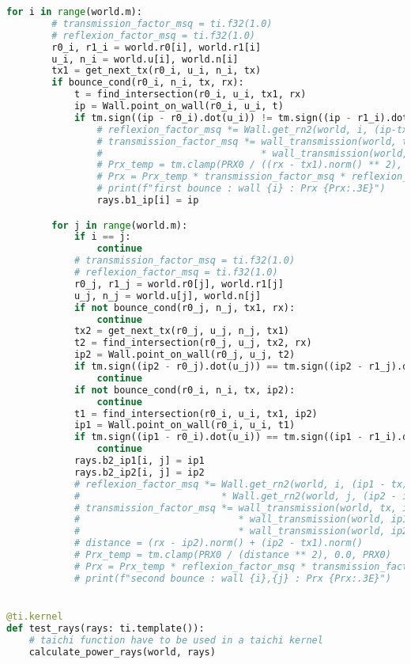 \begin{lstlisting}[language=python]
    for i in range(world.m):
        # transmission_factor_msq = ti.f32(1.0)
        # reflexion_factor_msq = ti.f32(1.0)
        r0_i, r1_i = world.r0[i], world.r1[i]
        u_i, n_i = world.u[i], world.n[i]
        tx1 = get_next_tx(r0_i, u_i, n_i, tx)
        if bounce_cond(r0_i, n_i, tx, rx):
            t = find_intersection(r0_i, u_i, tx1, rx)
            ip = Wall.point_on_wall(r0_i, u_i, t)
            if tm.sign((ip - r0_i).dot(u_i)) != tm.sign((ip - r1_i).dot(u_i)):
                # reflexion_factor_msq *= Wall.get_rn2(world, i, (ip-tx).normalized())
                # transmission_factor_msq *= wall_transmission(world, tx, ip, i) \
                #                            * wall_transmission(world, ip, rx, i)
                # Prx_temp = tm.clamp(PRX0 / ((rx - tx1).norm() ** 2), 0.0, PRX0)
                # Prx = Prx_temp * transmission_factor_msq * reflexion_factor_msq
                # print(f"first bounce : wall {i} : Prx {Prx:.3E}")
                rays.b1_ip[i] = ip

        for j in range(world.m):
            if i == j:
                continue
            # transmission_factor_msq = ti.f32(1.0)
            # reflexion_factor_msq = ti.f32(1.0)
            r0_j, r1_j = world.r0[j], world.r1[j]
            u_j, n_j = world.u[j], world.n[j]
            if not bounce_cond(r0_j, n_j, tx1, rx):
                continue
            tx2 = get_next_tx(r0_j, u_j, n_j, tx1)
            t2 = find_intersection(r0_j, u_j, tx2, rx)
            ip2 = Wall.point_on_wall(r0_j, u_j, t2)
            if tm.sign((ip2 - r0_j).dot(u_j)) == tm.sign((ip2 - r1_j).dot(u_j)):
                continue
            if not bounce_cond(r0_i, n_i, tx, ip2):
                continue
            t1 = find_intersection(r0_i, u_i, tx1, ip2)
            ip1 = Wall.point_on_wall(r0_i, u_i, t1)
            if tm.sign((ip1 - r0_i).dot(u_i)) == tm.sign((ip1 - r1_i).dot(u_i)):
                continue
            rays.b2_ip1[i, j] = ip1
            rays.b2_ip2[i, j] = ip2
            # reflexion_factor_msq *= Wall.get_rn2(world, i, (ip1 - tx).normalized()) \
            #                         * Wall.get_rn2(world, j, (ip2 - ip1).normalized())
            # transmission_factor_msq *= wall_transmission(world, tx, ip1, i) \
            #                            * wall_transmission(world, ip1, ip2, j, i) \
            #                            * wall_transmission(world, ip2, rx, j)
            # distance = (rx - ip2).norm() + (ip2 - tx1).norm()
            # Prx_temp = tm.clamp(PRX0 / (distance ** 2), 0.0, PRX0)
            # Prx = Prx_temp * reflexion_factor_msq * transmission_factor_msq
            # print(f"second bounce : wall {i},{j} : Prx {Prx:.3E}")


@ti.kernel
def test_rays(rays: ti.template()):
    # taichi function have to be used in a taichi kernel
    calculate_power_rays(world, rays)

\end{lstlisting}